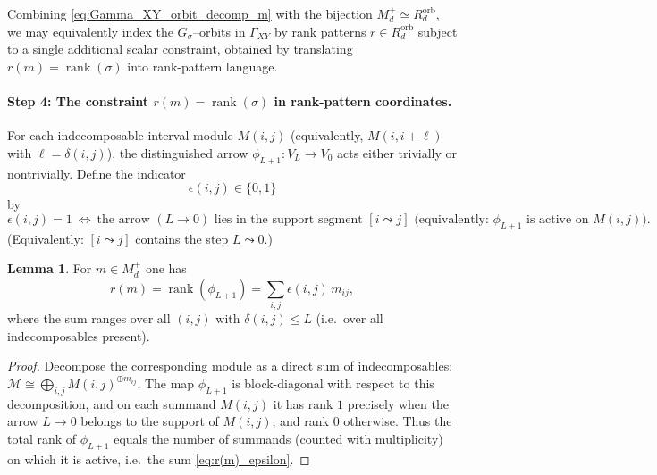 \documentclass{article}
\newcommand{\rank}{\operatorname{rank}}
\theoremstyle{definition}
\newtheorem{lemma}[theorem]{Lemma}
\begin{document}
Combining \eqref{eq:Gamma_XY_orbit_decomp_m} with the bijection $M_d^+\simeq R_d^{\mathrm{orb}}$,
we may equivalently index the $G_\sigma$--orbits in $\Gamma_{XY}$ by rank patterns
$r\in R_d^{\mathrm{orb}}$ subject to a single additional scalar constraint,
obtained by translating $r(m)=\rank(\sigma)$ into rank-pattern language.

\paragraph{Step 4: The constraint $r(m)=\rank(\sigma)$ in rank-pattern coordinates.}
For each indecomposable interval module $M(i,j)$ (equivalently, $M(i,i+\ell)$ with $\ell=\delta(i,j)$),
the distinguished arrow $\phi_{L+1}:V_L\to V_0$ acts either trivially or nontrivially. Define the indicator
\[
\epsilon(i,j)\in\{0,1\}
\]
by
\[
\epsilon(i,j)=1 \ \Longleftrightarrow\ 
\text{the arrow } (L\to 0) \text{ lies in the support segment } [i\leadsto j]
\text{ (equivalently: $\phi_{L+1}$ is active on $M(i,j)$)}.
\]
(Equivalently: $[i\leadsto j]$ contains the step $L\leadsto 0$.)

\begin{lemma}\label{lem:r_of_m_epsilon}
For $m\in M_d^+$ one has
\begin{equation}\label{eq:r(m)_epsilon}
r(m)=\rank(\phi_{L+1})
=
\sum_{i,j}\epsilon(i,j)\,m_{ij},
\end{equation}
where the sum ranges over all $(i,j)$ with $\delta(i,j)\le L$ (i.e.\ over all indecomposables present).
\end{lemma}

\begin{proof}
Decompose the corresponding module as a direct sum of indecomposables:
$\mathcal M \cong \bigoplus_{i,j} M(i,j)^{\oplus m_{ij}}$.
The map $\phi_{L+1}$ is block-diagonal with respect to this decomposition, and on each summand $M(i,j)$
it has rank $1$ precisely when the arrow $L\to 0$ belongs to the support of $M(i,j)$, and rank $0$ otherwise.
Thus the total rank of $\phi_{L+1}$ equals the number of summands (counted with multiplicity) on which it is active,
i.e.\ the sum \eqref{eq:r(m)_epsilon}.
\end{proof}
\end{document}
